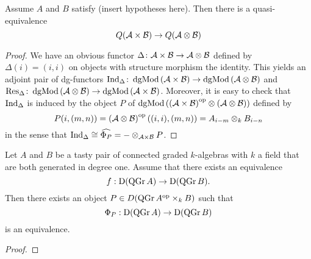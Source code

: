 \begin{lemma}\label{lemma: Q(AxB) is Q(A tensor B)}
  Assume \(A\) and \(B\) satisfy (insert hypotheses here).
  Then there is a quasi-equivalence
  \[Q(\mathcal{A} \times \mathcal{B}) \to Q(\mathcal{A} \otimes \mathcal{B})\]
\end{lemma}

\begin{proof}
  We have an obvious functor \(\Delta \colon \mathcal{A} \times \mathcal{B} \to \mathcal{A} \otimes \mathcal{B}\) defined by \(\Delta(i) = (i,i)\) on objects with structure morphism the identity.
  This yields an adjoint pair of dg-functors \(\operatorname{Ind}_{\Delta} \colon \operatorname{dgMod}\left(\mathcal{A} \times \mathcal{B}\right) \to \operatorname{dgMod}\left(\mathcal{A} \otimes \mathcal{B}\right)\) and \(\operatorname{Res}_{\Delta} \colon \operatorname{dgMod}\left(\mathcal{A} \otimes \mathcal{B}\right) \to \operatorname{dgMod}\left(\mathcal{A} \times \mathcal{B}\right)\).
  Moreover, it is easy to check that \(\operatorname{Ind}_{\Delta}\) is induced by the object \(P\) of \(\operatorname{dgMod}\left(\left(\mathcal{A} \times \mathcal{B}\right)^{\operatorname{op}} \otimes \left(\mathcal{A} \otimes \mathcal{B} \right)\right)\) defined by
  \[P(i,(m,n)) = \left(\mathcal{A} \otimes \mathcal{B}\right)^{\operatorname{op}}\left((i,i),(m,n)\right) = A_{i- m} \otimes_k B_{i - n}\]
  in the sense that \(\operatorname{Ind}_{\Delta} \cong \widehat{\Phi_P} = - \otimes_{\mathcal{A} \times \mathcal{B}} P\).
\end{proof}
\begin{corollary} \label{corollary: NCP morita degree 1}
  Let \(A\) and \(B\) be a tasty pair of connected graded \(k\)-algebras with \(k\) a field that are both generated in degree one.
  Assume that there exists an equivalence
  \begin{displaymath}
    f : \mathrm{D} (\operatorname{QGr}A) \to \mathrm{D} (\operatorname{QGr}B).
  \end{displaymath}
  Then there exists an object \(P \in D ( \operatorname{QGr}A^{\operatorname{op}} \times_k B )\) such that 
  \begin{displaymath}
    \Phi_P : \mathrm{D} ( \operatorname{QGr}A) \to \mathrm{D} (\operatorname{QGr}B )
  \end{displaymath}
  is an equivalence.
\end{corollary}

\begin{proof}
\end{proof}
